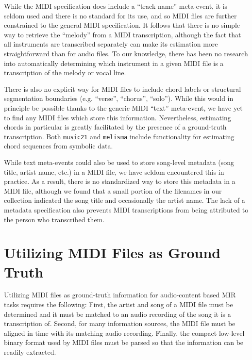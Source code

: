 \documentclass{article}
\begin{document}
While the MIDI specification does include a ``track name'' meta-event, it is seldom used and there is no standard for its use, and so MIDI files are further constrained to the general MIDI specification.
It follows that there is no simple way to retrieve the ``melody'' from a MIDI transcription, although the fact that all instruments are transcribed separately can make its estimation more straightforward than for audio files.
To our knowledge, there has been no research into automatically determining which instrument in a given MIDI file is a transcription of the melody or vocal line.

There is also no explicit way for MIDI files to include chord labels or structural segmentation boundaries (e.g. ``verse'', ``chorus'', ``solo'').
While this would in principle be possible thanks to the generic MIDI ``text'' meta-event, we have yet to find any MIDI files which store this information.
Nevertheless, estimating chords in particular is greatly facilitated by the presence of a ground-truth transcription.
Both \texttt{music21} \cite{cuthbert2010music21} and \texttt{melisma} \cite{sleator2001melisma} include functionality for estimating chord sequences from symbolic data.

While text meta-events could also be used to store song-level metadata (song title, artist name, etc.) in a MIDI file, we have seldom encountered this in practice.
As a result, there is no standardized way to store this metadata in a MIDI file, although we found that a small portion of the filenames in our collection indicated the song title and occasionally the artist name.
The lack of a metadata specification also prevents MIDI transcriptions from being attributed to the person who transcribed them.

\section{Utilizing MIDI Files as Ground Truth}
\label{sec:utilizing}

Utilizing MIDI files as ground-truth information for audio-content based MIR tasks requires the following:
First, the artist and song of a MIDI file must be determined and it must be matched to an audio recording of the song it is a transcription of.
Second, for many information sources, the MIDI file must be aligned in time with its matching audio recording.
Finally, the compact low-level binary format used by MIDI files must be parsed so that the information can be readily extracted.
\end{document}
